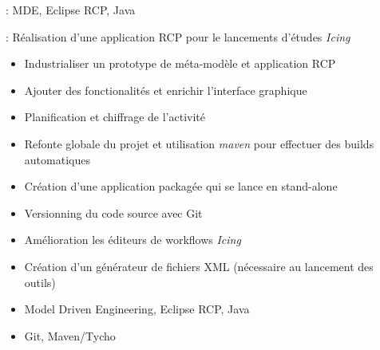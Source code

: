 

 : MDE, Eclipse RCP, Java

 : Réalisation d'une application RCP pour le lancements d'études {\it Icing}

\bigskip


\begin{itemize}
\item Industrialiser un prototype de méta-modèle et application RCP
\item Ajouter des fonctionalités et enrichir l'interface graphique
\end{itemize} 


\begin{itemize}
\item Planification et chiffrage de l'activité
\item Refonte globale du projet et utilisation {\it maven} pour effectuer des builds automatiques
\item Création d'une application packagée qui se lance en stand-alone
\item Versionning du code source avec Git
\item Amélioration les éditeurs de workflows {\it Icing}
\item Création d'un générateur de fichiers XML (nécessaire au lancement des outils)
\end{itemize} 


\begin{itemize}
\item Model Driven Engineering, Eclipse RCP, Java
\item Git, Maven/Tycho
\end{itemize}